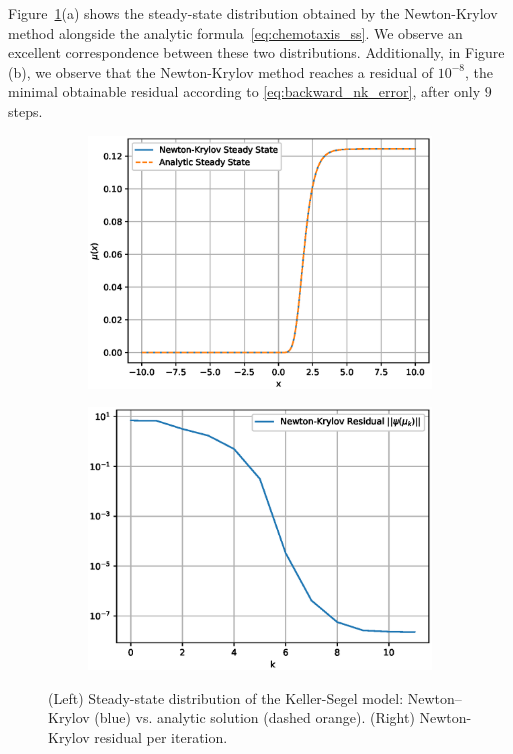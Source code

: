 \documentclass{article}
\begin{document}
Figure~\ref{fig:chemotaxis_fp}(a) shows the steady-state distribution obtained by the Newton-Krylov method alongside the analytic formula~\eqref{eq:chemotaxis_ss}. We observe an excellent correspondence between these two distributions. Additionally, in Figure (b), we observe that the Newton-Krylov method reaches a residual of $10^{-8}$, the minimal obtainable residual according to \eqref{eq:backward_nk_error}, after only $9$ steps.
\begin{figure}[h]
    \centering
    \begin{subfigure}[b]{0.5\textwidth}
        \includegraphics[width=\textwidth]{figures/nk_fp_chemotaxis_ss.eps}
    \end{subfigure}%
    \begin{subfigure}[b]{0.5\textwidth}
        \includegraphics[width=\textwidth]{figures/nk_fp_chemotaxis_residual.eps}
    \end{subfigure}
    \caption{(Left) Steady-state distribution of the Keller-Segel model: Newton--Krylov (blue) vs. analytic solution (dashed orange). (Right) Newton-Krylov residual per iteration.}
    \label{fig:chemotaxis_fp}
\end{figure}
\end{document}
